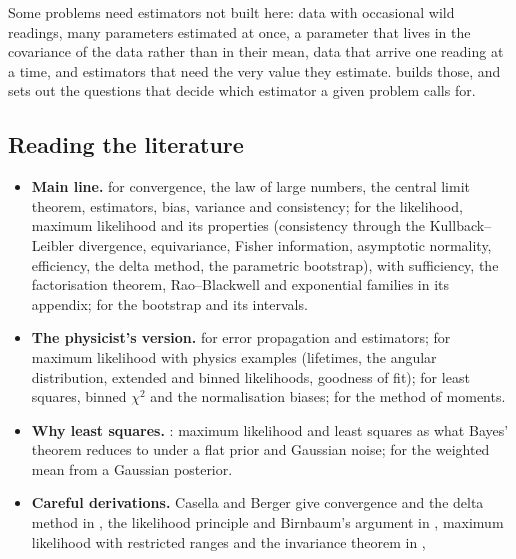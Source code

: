 Some problems need estimators not built here: data with occasional wild readings, many parameters estimated at once, a parameter that lives in the covariance of the data rather than in their mean, data that arrive one reading at a time, and estimators that need the very value they estimate.  builds those, and sets out the questions that decide which estimator a given problem calls for.

\subsection*{Reading the literature}

\begin{itemize}[leftmargin=1.2em,itemsep=2pt]
  \item \textbf{Main line.}  for convergence, the law of
        large numbers, the central limit theorem, estimators, bias, variance
        and consistency;  for the likelihood, maximum
        likelihood and its properties (consistency through the
        Kullback--Leibler divergence, equivariance, Fisher information,
        asymptotic normality, efficiency, the delta method, the parametric
        bootstrap), with sufficiency, the factorisation theorem, Rao--Blackwell and
        exponential families in its appendix;  for the bootstrap and its
        intervals.
  \item \textbf{The physicist's version.}  for error propagation and estimators; 
        for maximum likelihood with physics examples (lifetimes, the angular
        distribution, extended and binned likelihoods, goodness of fit);
         for least squares, binned $\chi^2$ and the
        normalisation biases;  for the method of
        moments.
  \item \textbf{Why least squares.} : maximum
        likelihood and least squares as what Bayes' theorem reduces to
        under a flat prior and Gaussian noise;  for
        the weighted mean from a Gaussian posterior.
  \item \textbf{Careful derivations.} Casella and Berger give convergence
        and the delta method in , the
        likelihood principle and Birnbaum's argument in
        , maximum likelihood with restricted
        ranges and the invariance theorem in ,

\end{itemize}
